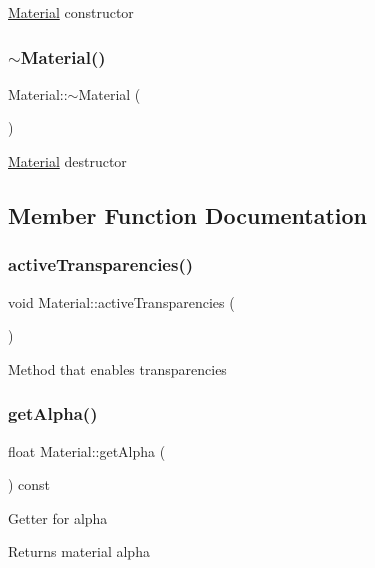\hyperlink{classMaterial}{Material} constructor \mbox{\label{classMaterial_a2c19452d71f54075df8f5405b03129f4}} 
\subsubsection{\texorpdfstring{$\sim$\+Material()}{~Material()}}
{\footnotesize\ttfamily Material\+::$\sim$\+Material (\begin{DoxyParamCaption}{ }\end{DoxyParamCaption})\hspace{0.3cm}{\ttfamily [virtual]}}

\hyperlink{classMaterial}{Material} destructor 

\subsection{Member Function Documentation}
\mbox{\label{classMaterial_ae2506a2546ec45c89d55db14e4e31aaf}} 
\subsubsection{\texorpdfstring{active\+Transparencies()}{activeTransparencies()}}
{\footnotesize\ttfamily void Material\+::active\+Transparencies (\begin{DoxyParamCaption}{ }\end{DoxyParamCaption})}

Method that enables transparencies \mbox{\label{classMaterial_a85d93ae12ca34b523b6913ed259581bb}} 
\subsubsection{\texorpdfstring{get\+Alpha()}{getAlpha()}}
{\footnotesize\ttfamily float Material\+::get\+Alpha (\begin{DoxyParamCaption}{ }\end{DoxyParamCaption}) const}

Getter for alpha \begin{DoxyReturn}{Returns}
material alpha 
\end{DoxyReturn}
\mbox{\label{classMaterial_a0d33566869498ffeb5a6983838ccc46f}} 
